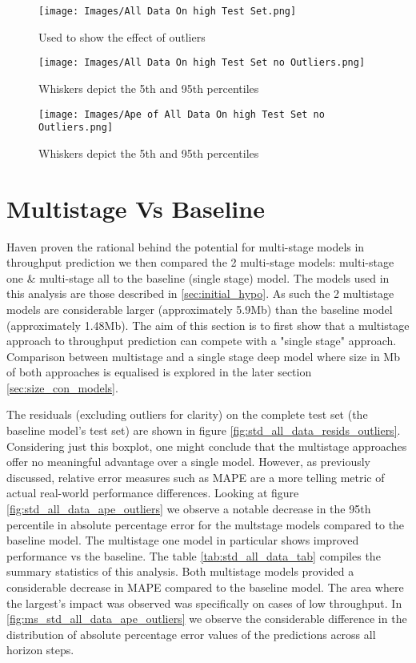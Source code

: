 \begin{figure}[!htb]
\texttt{[image: Images/All Data On high Test Set.png]}
\centering
\caption{Used to show the effect of outliers}
\label{fig:std_all_high_resids_outliers}
\end{figure}

\begin{figure}[!htb]
\texttt{[image: Images/All Data On high Test Set no Outliers.png]}
\centering
\caption{Whiskers depict the 5th and 95th percentiles}
\label{fig:std_all_high_resids}
\end{figure}

\begin{figure}[H]
\texttt{[image: Images/Ape of All Data On high Test Set no Outliers.png]}
\centering
\caption{Whiskers depict the 5th and 95th percentiles}
\label{fig:std_all_high_ape}
\end{figure}








\newpage
\section{Multistage Vs Baseline}
Haven proven the rational behind the potential for multi-stage models in throughput prediction we then compared the 2 
multi-stage models: multi-stage one \& multi-stage all to the baseline (single stage) model. The models used in this analysis are those described in \ref{sec:initial_hypo}. As such the 2 multistage models are considerable larger (approximately 5.9Mb) than the baseline model (approximately 1.48Mb). The aim of this section is to first show that a multistage approach to throughput prediction can compete with a "single stage" approach. Comparison between multistage and a single stage deep model where size in Mb of both approaches is equalised is explored in the later section \ref{sec:size_con_models}.

The residuals (excluding outliers for clarity) on the complete test set (the baseline model's test set) are shown in figure \ref{fig:std_all_data_resids_outliers}. Considering just this boxplot, one might conclude that the multistage approaches offer no meaningful advantage over a single model. However, as previously discussed, relative error measures such as MAPE are a more telling metric of actual real-world performance differences. Looking at figure \ref{fig:std_all_data_ape_outliers} we observe a notable decrease in the 95th percentile in absolute percentage error for the multstage models compared to the baseline model. The multistage one model in particular shows improved performance vs the baseline. The table \ref{tab:std_all_data_tab} compiles the summary statistics of this analysis. Both multistage models provided a considerable decrease in MAPE compared to the baseline model. The area where the largest's impact was observed was specifically on cases of low throughput. In \ref{fig:ms_std_all_data_ape_outliers} we observe the considerable difference in the distribution of absolute percentage error values of the predictions across all horizon steps.

